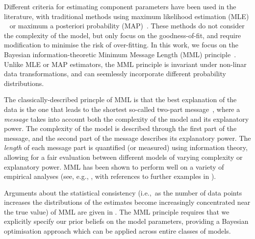 \documentclass{elsarticle}
\begin{document}
Different criteria for estimating component parameters have been used in the 
literature, with traditional methods using maximum likelihood estimation (MLE)
~\cite{akaike1971determination} or maximum a posteriori probability (MAP)~\cite{shimony1994finding}.
These methods do not consider the complexity of the model, but only focus on
the goodness-of-fit, and require modification to minimise the risk of
over-fitting. In this work, we focus on the Bayesian information-theoretic 
Minimum Message Length (MML) principle~\cite{WallaceBoulton1968, WallaceFreeman1987, WallaceDowe1999a, Wallace05}.
Unlike MLE or MAP estimators, the MML principle is invariant under non-linar
data transformations, and can seemlessly incorporate different probability
distributions.



%
%
The classically-described princple of MML is that the best explanation of the
data is the one that leads to the shortest so-called two-part message~\cite{Wallace05}, 
where a \textit{message} takes into account both the complexity of the model 
and its explanatory power. The complexity of the model is described through
the first part of the message, and the second part of the message describes
its explanatory power. The \emph{length} of each message part is quantified
(or measured) using information theory, allowing for a fair evaluation between
different models of varying complexity or explanatory power. MML has been 
shown to perform well on a variety of empirical analyses (see, e.g., 
\cite{viswanathan1999finding,fitzgibbon2004minimum}, with references to 
further examples in \cite{Wallace05,dowe2007bayes,Dowe2008a,Dowe2011a}).


Arguments about the statistical consistency (i.e.,~as the number of data 
points increases the distributions of the estimates become increasingly 
concentrated near the true value) of MML are given in \cite{DoweWallace1997a,Dowe2011a}.
The MML principle requires that we explicitly specify our prior beliefs on the
model parameters, providing a Bayesian optimisation approach which can be
applied across entire classes of models.
\end{document}
